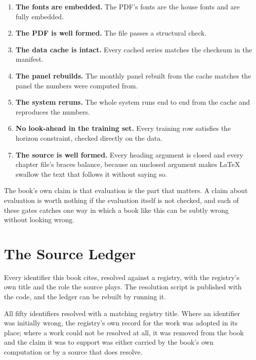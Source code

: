 \begin{enumerate}
or password.
\item \textbf{The fonts are embedded.} The PDF's fonts are the house
fonts and are fully embedded.
\item \textbf{The PDF is well formed.} The file passes a structural
check.
\item \textbf{The data cache is intact.} Every cached series matches the
checksum in the manifest.
\item \textbf{The panel rebuilds.} The monthly panel rebuilt from the
cache matches the panel the numbers were computed from.
\item \textbf{The system reruns.} The whole system runs end to end from
the cache and reproduces the numbers.
\item \textbf{No look-ahead in the training set.} Every training row
satisfies the horizon constraint, checked directly on the data.
\item \textbf{The source is well formed.} Every heading argument is
closed and every chapter file's braces balance, because an unclosed
argument makes LaTeX swallow the text that follows it without saying so.
\end{enumerate}

\begin{takeaway}
The book's own claim is that evaluation is the part that matters. A claim
about evaluation is worth nothing if the evaluation itself is not checked,
and each of these gates catches one way in which a book like this can be
subtly wrong without looking wrong.
\end{takeaway}
\clearpage

\chapter{The Source Ledger}
\label{app:ledger}

\thispagestyle{plain}

Every identifier this book cites, resolved against a registry, with the
registry's own title and the role the source plays. The resolution
script is published with the code, and the ledger can be rebuilt by
running it.

All fifty identifiers resolved with a matching registry title. Where an
identifier was initially wrong, the registry's own record for the work
was adopted in its place; where a work could not be resolved at all, it
was removed from the book and the claim it was to support was either
carried by the book's own computation or by a source that does resolve.

